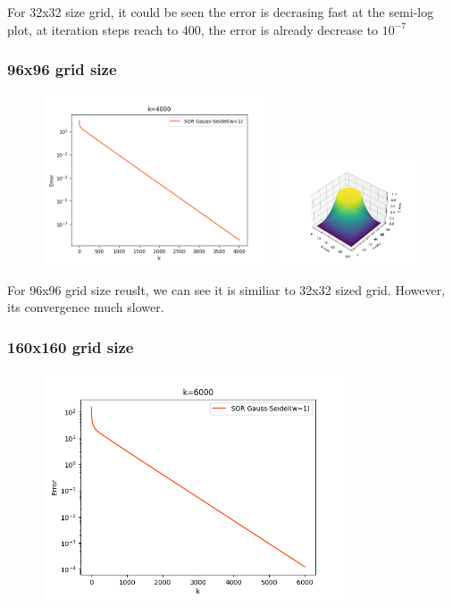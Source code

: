 \documentclass[12pt]{article}
\begin{document}
For 32x32 size grid, it could be seen the error is decrasing fast at the semi-log 
plot, at iteration steps reach to 400, the error is already decrease to $10^{-7}$


\subsubsection{96x96 grid size}


\begin{figure}[H]
    \centering
    \includegraphics[width=0.6\textwidth]{aP=96.png}
    \includegraphics[width=0.38\textwidth]{96X96show.png}

    \label{aP=96.png}
\end{figure}

For 96x96 grid size reuslt, we can see it is similiar to 32x32 sized grid.
However, its convergence much slower.



\subsubsection{160x160 grid size}


\begin{figure}[H]
    \centering
    \includegraphics[width=0.8\textwidth]{aP=160.png}
    \label{aP=160.png}
\end{figure}
\end{document}
